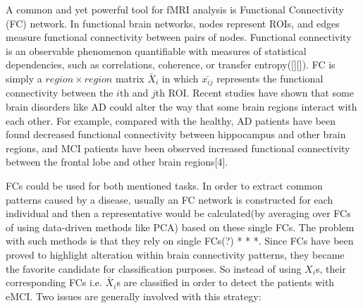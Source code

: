 \documentclass[journal]{IEEEtran}
\begin{document}
A common and yet powerful tool for fMRI analysis is Functional Connectivity (FC) network.  In
functional brain networks, nodes represent ROIs, and edges measure functional connectivity
between pairs of nodes. Functional connectivity is an observable
phenomenon quantifiable with measures of statistical dependencies, such as correlations, coherence, or transfer entropy([][]). FC is simply a $region \times region$ matrix $\bar{X}_i$ in which $\bar{x_{ij}}$ represents the functional connectivity between the $i$th and $j$th ROI. Recent studies have shown that some brain disorders like AD could alter the way that some brain regions interact with each other. For example, compared with the healthy, AD patients have been found decreased functional connectivity between hippocampus and other brain regions, and MCI patients have been observed increased functional connectivity between the frontal lobe and other brain regions[4].  

FCs could be used for both mentioned tasks. In order to extract common patterns caused by a disease, usually an FC network is constructed for each individual and then a representative would be calculated(by averaging over FCs of using data-driven methods like PCA) based on these single FCs. The problem with such methods is that they rely on single FCs(?) * * *.
Since FCs have been proved to highlight alteration within brain connectivity patterns, they became the favorite candidate for classification purposes. So instead of using $X_i$s, their corresponding FCs i.e. $\bar{X}_i$s are classified in order to detect the patients with eMCI. Two issues are generally
involved with this strategy:
  
\end{document}
